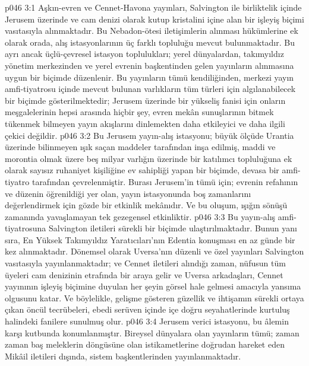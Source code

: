 \vs p046 3:1 Aşkın\hyp{}evren ve Cennet\hyp{}Havona yayınları, Salvington ile birliktelik içinde Jerusem üzerinde ve cam denizi olarak kutup kristalini içine alan bir işleyiş biçimi vasıtasıyla alınmaktadır. Bu Nebadon\hyp{}ötesi iletişimlerin alınması hükümlerine ek olarak orada, alış istasyonlarının üç farklı topluluğu mevcut bulunmaktadır. Bu ayrı ancak üçlü\hyp{}çevresel istasyon toplulukları; yerel dünyalardan, takımyıldız yönetim merkezinden ve yerel evrenin başkentinden gelen yayınların alınmasına uygun bir biçimde düzenlenir. Bu yayınların tümü kendiliğinden, merkezi yayın amfi\hyp{}tiyatrosu içinde mevcut bulunan varlıkların tüm türleri için algılanabilecek bir biçimde gösterilmektedir; Jerusem üzerinde bir yükseliş fanisi için onların meşgalelerinin hepsi arasında hiçbir şey, evren mekân sunuşlarının bitmek tükenmek bilmeyen yayın akışlarını dinlemekten daha etkileyici ve daha ilgili çekici değildir.
\vs p046 3:2 Bu Jerusem yayın\hyp{}alış istasyonu; büyük ölçüde Urantia üzerinde bilinmeyen ışık saçan maddeler tarafından inşa edilmiş, maddi ve morontia olmak üzere beş milyar varlığın üzerinde bir katılımcı topluluğuna ek olarak sayısız ruhaniyet kişiliğine ev sahipliği yapan bir biçimde, devasa bir amfi\hyp{}tiyatro tarafından çevrelenmiştir. Burası Jerusem’in tümü için; evrenin refahının ve düzenin öğrenildiği yer olan, yayın istasyonunda boş zamanlarını değerlendirmek için gözde bir etkinlik mekânıdır. Ve bu oluşum, ışığın sönüşü zamanında yavaşlamayan tek gezegensel etkinliktir.
\vs p046 3:3 Bu yayın\hyp{}alış amfi\hyp{}tiyatrosuna Salvington iletileri sürekli bir biçimde ulaştırılmaktadır. Bunun yanı sıra, En Yüksek Takımyıldız Yaratıcıları’nın Edentia konuşması en az günde bir kez alınmaktadır. Dönemsel olarak Uversa’nın düzenli ve özel yayınları Salvington vasıtasıyla yayınlanmaktadır; ve Cennet iletileri alındığı zaman, nüfusun tüm üyeleri cam denizinin etrafında bir araya gelir ve Uversa arkadaşları, Cennet yayınının işleyiş biçimine duyulan her şeyin görsel hale gelmesi amacıyla yansıma olgusunu katar. Ve böylelikle, gelişme gösteren güzellik ve ihtişamın sürekli ortaya çıkan öncül tecrübeleri, ebedi serüven içinde içe doğru seyahatlerinde kurtuluş halindeki fanilere sunulmuş olur.
\vs p046 3:4 Jerusem verici istasyonu, bu âlemin karşı kutbunda konumlanmıştır. Bireysel dünyalara olan yayınların tümü; zaman zaman baş meleklerin döngüsüne olan istikametlerine doğrudan hareket eden Mikâil iletileri dışında, sistem başkentlerinden yayınlanmaktadır.
